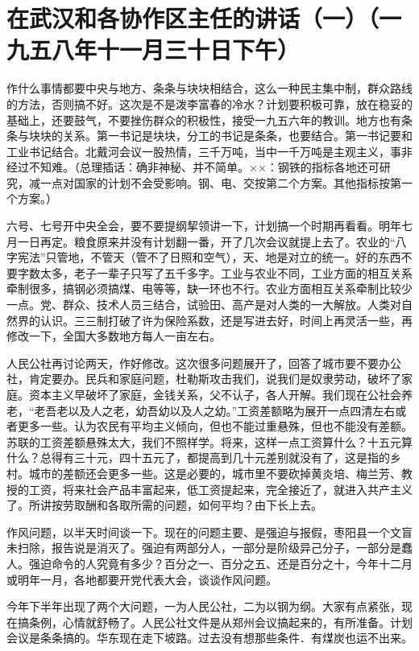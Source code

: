 \section[在武汉和各协作区主任的讲话（一）（一九五八年十一月三十日下午）]{在武汉和各协作区主任的讲话（一）（一九五八年十一月三十日下午）}


作什么事情都要中央与地方、条条与块块相结合，这么一种民主集中制，群众路线的方法，否则搞不好。这次是不是泼李富春的冷水？计划要积极可靠，放在稳妥的基础上，还要鼓气，不要挫伤群众的积极性，接受一九五六年的教训。地方也有条条与块块的关系。第一书记是块块，分工的书记是条条，也要结合。第一书记要和工业书记结合。北戴河会议一股热情，三千万吨，当中一千万吨是主观主义，事非经过不知难。（总理插话：确非神秘、并不简单。××：钢铁的指标各地还可研究，减一点对国家的计划不会受影响。钢、电、交按第二个方案。其他指标按第一个方案。）

六号、七号开中央全会，要不要提纲挈领讲一下，计划搞一个时期再看看。明年七月一日再定。粮食原来并没有计划翻一番，开了几次会议就提上去了。农业的“八字宪法”只管地，不管天（管不了日照和空气），天、地是对立的统一。好的东西不要字数太多，老子一辈子只写了五千多字。工业与农业不同，工业方面的相互关系牵制很多，搞钢必须搞煤、电等等，缺一环也不行。农业方面相互关系牵制比较少一点。党、群众、技术人员三结合，试验田、高产是对人类的一大解放。人类对自然界的认识。三三制打破了许为保险系数，还是写进去好，时间上再灵活一些，再修改一下，全国大多数地方每人一亩左右。

人民公社再讨论两天，作好修改。这次很多问题展开了，回答了城市要不要办公社，肯定要办。民兵和家庭问题，杜勒斯攻击我们，说我们是奴隶劳动，破坏了家庭。资本主义早破坏了家庭，金钱关系，父不认子，各人开解。我们现在公社会养老，“老吾老以及人之老，幼吾幼以及人之幼。”工资差额略为展开一点四清左右或者更多一些。认为农民有平均主义倾向，但也不能过重悬殊，但也不能没有差额。苏联的工资差额悬殊太大，我们不照样学。将来，这样一点工资算什么？十五元算什么？总得有三十元，四十五元了，都提高到几十元差别就没有了，这是指的乡村。城市的差额还会更多一些。这是必要的，城市里不要砍掉黄炎培、梅兰芳、教授的工资，将来社会产品丰富起来，低工资提起来，完全接近了，就进入共产主义了。所讲按劳取酬和各取所需的问题，如何平均？由下长上去。

作风问题，以半天时间谈一下。现在的问题主要、是强迫与报假，枣阳县一个文盲未扫除，报告说是消灭了。强迫有两部分人，一部分是阶级异己分子，一部分是蠢人。强迫命令的人究竟有多少？百分之一、百分之五、还是百分之十，今年十二月或明年一月，各地都要开党代表大会，谈谈作风问题。

今年下半年出现了两个大问题，一为人民公社，二为以钢为纲。大家有点紧张，现在搞条例，心情就舒畅了。人民公社文件是从郑州会议搞起来的，有所准备。计划会议是条条搞的。华东现在走下坡路。过去没有想那些条件．有煤炭也运不出来。

